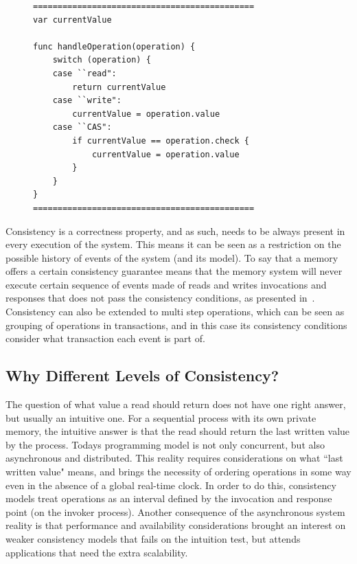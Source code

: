 \documentclass[12pt,conference]{IEEEtran}
\begin{document}
\begin{figure}[!t]
    \scriptsize
\begin{lstlisting}[caption={A Linearizable Register Model.},label={linearizableModelCode}]
=============================================
var currentValue

func handleOperation(operation) {
    switch (operation) {
    case ``read":
        return currentValue
    case ``write":
        currentValue = operation.value
    case ``CAS":
        if currentValue == operation.check {
            currentValue = operation.value
        }
    }
}
=============================================
\end{lstlisting}
\end{figure}

Consistency is a correctness property, and as such, needs to be always present in every execution of the system. This means it can be seen as a restriction on the possible history of events of the system (and its model). To say that a memory offers a certain consistency guarantee means that the memory system will never execute certain sequence of events made of reads and writes invocations and responses that does not pass the consistency conditions, as presented in~\cite{dziuma2013survey}. Consistency can also be extended to multi step operations, which can be seen as grouping of operations in transactions, and in this case its consistency conditions consider what transaction each event is part of.

\subsection{Why Different Levels of Consistency?}

The question of what value a read should return does not have one right answer, but usually an intuitive one. For a sequential process with its own private memory, the intuitive answer is that the read should return the last written value by the process. Todays programming model is not only concurrent, but also asynchronous and distributed. This reality requires considerations on what ``last written value" means, and brings the necessity of ordering operations in some way even in the absence of a global real-time clock. In order to do this, consistency models treat operations as an interval defined by the invocation and response point (on the invoker process). Another consequence of the asynchronous system reality is that performance and availability considerations brought an interest on weaker consistency models that fails on the intuition test, but attends applications that need the extra scalability.
\end{document}
